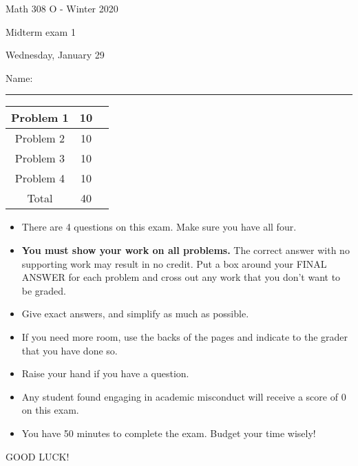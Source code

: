 \documentclass[12 pt]{report}
\begin{document}
\noindent \vfill \noindent \large

\centerline{Math 308 O - Winter 2020}

\centerline{Midterm exam 1}

\centerline{Wednesday, January 29}

\normalsize

\vfill
\medskip
Name: \rule{10cm}{1pt}

\bigskip

\vfill
\begin{center}
{\large
\begin{tabular}{||c|c|r||}
\hline Problem 1 & 10 & \hspace{10mm} \hfill \\
\hline Problem 2 & 10 & \hspace{10mm} \hfill \\
\hline Problem 3 & 10 & \hspace{10mm} \hfill \\
\hline Problem 4 & 10 & \hspace{10mm} \hfill \\
\hline Total & 40 & \hspace{10mm} \hfill \\
\hline
\end{tabular}
}
\end{center}
\vfill
\begin{itemize}
\item There are 4 questions on this exam. Make sure you have all four.
\item \textbf{You must show your work on all problems.}  The correct answer
with no supporting work may result in no credit. Put a box
around your FINAL ANSWER for each problem and cross out any work
that you don't want to be graded.
\item Give exact answers, and simplify as much as possible. 
\item If you need more room, use the backs
of the pages and indicate to the grader that you have done so.
\item Raise your hand if you have a question.
\item Any student found engaging in academic misconduct will receive
a score of 0 on this exam.
\item You have 50 minutes to complete the exam.  Budget your time wisely! \\
\end{itemize}
\vfill
\begin{center}GOOD LUCK!\end{center}
\end{document}

